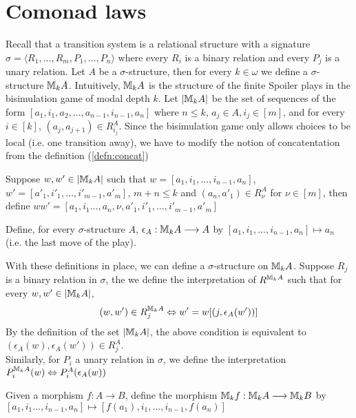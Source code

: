 \section{Comonad laws}
Recall that a transition system is a relational structure with a signature $\sigma = \langle R_{1},\dots,R_{m},P_{1},\dots,P_{n} \rangle$ where every $R_{i}$ is a binary relation and every $P_{j}$ is a unary relation. Let $A$ be a $\sigma$-structure, then for every $k \in \omega$ we define a  $\sigma$-structure ${\mathbb{M}_{k}A}$. Intuitively, ${\mathbb{M}_{k}A}$ is the structure of the finite Spoiler plays in the bisimulation game of modal depth $k$. Let $|{\mathbb{M}_{k}A}|$ be the set of sequences of the form $[a_{1},i_{1},a_{2},\dots,a_{n-1},i_{n-1},a_{n}]$ where $n \leq k$, $a_{j} \in A, i_{j} \in [m]$, and for every $i \in [k]$, $(a_{j},a_{j+1}) \in R^{A}_{i_{j}}$. Since the bisimulation game only allows choices to be local (i.e. one transition away), we have to modify the notion of concatentation from the definition (\ref{defn:concat}) 
\begin{defn}
Suppose $w,w' \in |{\mathbb{M}_{k}A}|$ such that $w = [a_{1},i_{1},\dots,i_{n-1},a_{n}]$, $w' = [a'_{1},i'_{1},\dots,i'_{m-1},a'_{m}]$, $m+n \leq k$ and $(a_{n},a'_{1}) \in R^{A}_{\nu}$ for $\nu \in [m]$, then define $ww' = [a_{1},i_{1}
\dots,a_{n},\nu,a'_{1},i'_{1},\dots,i'_{m-1},a'_{m}]$ 
\end{defn}
\begin{defn}
Define, for every $\sigma$-structure $A$, $\epsilon_{A}:{\mathbb{M}_{k}A} \longrightarrow A$ by $[a_{1},i_{1},\dots,i_{n-1},a_{n}] \mapsto a_{n}$ (i.e. the last move of the play). 
\label{defn:epsilonM}
\end{defn}
With these definitions in place, we can define a $\sigma$-structure on ${\mathbb{M}_{k}A}$. Suppose $R_{j}$ is a binary relation in $\sigma$, the we define the interpretation of $R^{{\mathbb{M}_{k}A}}$ such that for every $w,w' \in |{\mathbb{M}_{k}A}|$,
\begin{equation}
(w,w') \in R^{{\mathbb{M}_{k}A}}_{j} \Leftrightarrow w' = w[(j,\epsilon_{A}(w'))] \label{eq:R}
\end{equation}
By the definition of the set $|{\mathbb{M}_{k}A}|$, the above condition is equivalent to $(\epsilon_{A}(w),\epsilon_{A}(w')) \in R^{A}_{j}$. \\
Similarly, for $P_{i}$ a unary relation in $\sigma$, we define the interpretation $P^{{\mathbb{M}_{k}A}}_{i}(w) \Leftrightarrow P^{A}_{i}(\epsilon_{A}(w))$
\begin{defn}
Given a morphism $f:A \longrightarrow B$, define the morphism ${\mathbb{M}_{k}f}:{\mathbb{M}_{k}A} \longrightarrow {\mathbb{M}_{k}B}$ by $[a_{1},i_{1}\dots,i_{n-1},a_{n}] \mapsto [f(a_{1}),i_{1},\dots,i_{n-1},f(a_{n})]$
\label{defn:comonadMorphismM}
\end{defn}
